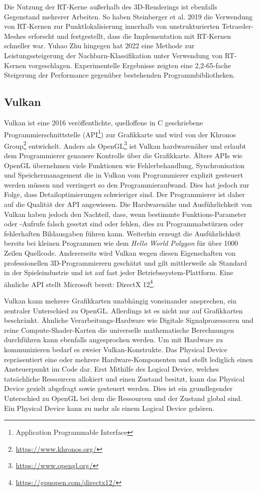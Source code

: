\documentclass[11pt]{scrartcl}
\begin{document}
	Die Nutzung der RT-Kerne außerhalb des 3D-Renderings ist ebenfalls Gegenstand mehrerer Arbeiten. So haben Steinberger et al. 2019 die Verwendung von RT-Kernen zur Punktlokalisierung innerhalb von unstrukturierten Tetraeder-Meshes erforscht und festgestellt, dass die Implementation mit RT-Kernen schneller war\cite{Steinberger2019}. Yuhao Zhu hingegen hat 2022 eine Methode zur Leistungssteigerung der Nachbarn-Klassifikation unter Verwendung von RT-Kernen vorgeschlagen\cite{zhu2022rtnn}. Experimentelle Ergebnisse zeigten eine 2,2-65-fache Steigerung der Performance gegenüber bestehenden Programmbibliotheken.
	
	\subsection{Vulkan}
	
	Vulkan ist eine 2016 veröffentlichte, quelloffene in C geschriebene Programmierschnittstelle (API\footnote{Application Programmable Interface}) zur Grafikkarte und wird von der Khronos Group\footnote{\url{https://www.khronos.org/}} entwickelt. Anders als OpenGL\footnote{\url{https://www.opengl.org/}} ist Vulkan hardwarenäher und erlaubt dem Programmierer genauere Kontrolle über die Grafikkarte. Ältere APIs wie OpenGL übernehmen viele Funktionen wie Fehlerbehandlung, Synchronisation und Speichermanagement die in Vulkan vom Programmierer explizit gesteuert werden müssen und verringert so den Programmieraufwand. Dies hat jedoch zur Folge, dass Detailoptimierungen schwieriger sind. Der Programmierer ist daher auf die Qualität der API angewiesen.\cite{Sellers2017} Die Hardwarenähe und Ausführlichkeit von Vulkan haben jedoch den Nachteil, dass, wenn bestimmte Funktions-Parameter oder -Aufrufe falsch gesetzt sind oder fehlen, dies zu Programmabstürzen oder fehlerhaften Bildausgaben führen kann. Weiterhin erzeugt die Ausführlichkeit bereits bei kleinen Programmen wie dem \textit{Hello World Polygon} für über 1000 Zeilen Quellcode. Andererseits wird Vulkan wegen diesen Eigenschaften von professionellen 3D-Programmierern geschätzt und gilt mittlerweile als Standard in der Spieleindustrie und ist auf fast jeder Betriebssystem-Plattform. Eine ähnliche API stellt Microsoft bereit: DirectX 12\footnote{\url{https://gpuopen.com/directx12/}}.
	
	Vulkan kann mehrere Grafikkarten unabhängig voneinander ansprechen, ein zentraler Unterschied zu OpenGL. Allerdings ist es nicht nur auf Grafikkarten beschränkt. Ähnliche Verarbeitungs-Hardware wie Digitale Signalprozessoren und reine Compute-Shader-Karten die universelle mathematische Berechnungen durchführen kann ebenfalls angesprochen werden\cite{Sellers2017}. Um mit Hardware zu kommunizieren bedarf es zweier Vulkan-Konstrukte. Das Physical Device repräsentiert eine oder mehrere Hardware-Komponenten und stellt lediglich einen Ansteuerpunkt im Code dar. Erst Mithilfe des Logical Device, welches tatsächliche Ressourcen allokiert und einen Zustand besitzt, kann das Physical Device gezielt abgefragt sowie gesteuert werden. Dies ist ein grundlegender Unterschied zu OpenGL bei dem die Ressourcen und der Zustand global sind. Ein Physical Device kann zu mehr als einem Logical Device gehören.\cite{Sellers2017, VulkanPhysicalDevice, VulkanLogicalDevice}
	
\end{document}
